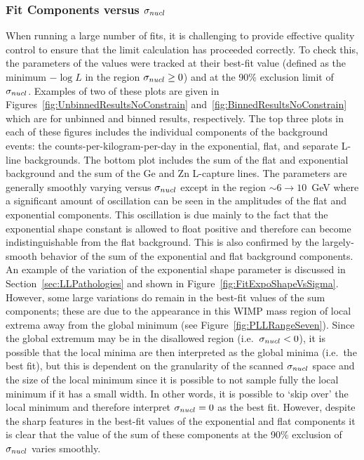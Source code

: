 			\subsubsection{Fit Components versus \texorpdfstring{$\sigma_{nucl}$}{sigma\_nuc}}
When running a large number of fits, it is challenging to provide effective quality control to ensure that the limit calculation has proceeded correctly.  To check this, the parameters of the values were tracked at their best-fit value (defined as the minimum $-\log L$ in the region $\sigma_{nucl}\geq0$) and at the 90\% exclusion limit of $\sigma_{nucl}$.  Examples of two of these plots are given in Figures~\ref{fig:UnbinnedResultsNoConstrain} and~\ref{fig:BinnedResultsNoConstrain} which are for unbinned and binned results, respectively.  The top three plots in each of these figures includes the individual components of the background events: the counts-per-kilogram-per-day in the exponential, flat, and separate L-line backgrounds.  The bottom plot includes the sum of the flat and exponential background and the sum of the Ge and Zn L-capture lines.  The parameters are generally smoothly varying versus $\sigma_{nucl}$ except in the region $\sim6\to10$~GeV where a significant amount of oscillation can be seen in the amplitudes of the flat and exponential components.  This oscillation is due mainly to the fact that the exponential shape constant is allowed to float positive and therefore can become indistinguishable from the flat background.  This is also confirmed by the largely-smooth behavior of the sum of the exponential and flat background components.  An example of the variation of the exponential shape parameter is discussed in Section~\ref{sec:LLPathologies} and shown in Figure~\ref{fig:FitExpoShapeVsSigma}.  However, some large variations do remain in the best-fit values of the sum components; these are due to the appearance in this WIMP mass region of local extrema away from the global minimum (see Figure~\ref{fig:PLLRangeSeven}).  Since the global extremum may be in the disallowed region (i.e.~$\sigma_{nucl}<0$), it is possible that the local minima are then interpreted as the global minima (i.e.~the best fit), but this is dependent on the granularity of the scanned $\sigma_{nucl}$ space and the size of the local minimum since it is possible to not sample fully the local minimum if it has a small width.  In other words, it is possible to `skip over' the local minimum and therefore interpret $\sigma_{nucl}=0$ as the best fit.  However, despite the sharp features in the best-fit values of the exponential and flat components it is clear that the value of the sum of these components at the 90\% exclusion of $\sigma_{nucl}$ varies smoothly.  

